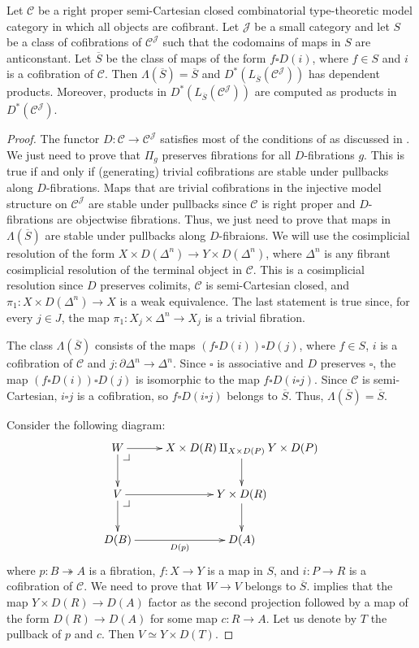 \documentclass[reqno]{amsart}
\makeatletter
\theoremstyle{definition}
\theoremstyle{remark}
\newcommand{\scat}[1]{\mathcal{#1}}
\numberwithin{figure}{section}
\newcommand{\pb}[1][dr]{\save*!/#1-1.2pc/#1:(-1,1)@^{|-}\restore}
\makeatother
\begin{document}
\begin{prop}
Let $\scat{C}$ be a right proper semi-Cartesian closed combinatorial type-theoretic model category in which all objects are cofibrant.
Let $\scat{J}$ be a small category and let $S$ be a class of cofibrations of $\scat{C}^\scat{J}$ such that the codomains of maps in $S$ are anticonstant.
Let $\overline{S}$ be the class of maps of the form $f \square D(i)$, where $f \in S$ and $i$ is a cofibration of $\scat{C}$.
Then $\Lambda(\overline{S}) = \overline{S}$ and $D^*(L_{\overline{S}}(\scat{C}^\scat{J}))$ has dependent products.
Moreover, products in $D^*(L_{\overline{S}}(\scat{C}^\scat{J}))$ are computed as products in $D^*(\scat{C}^\scat{J})$.
\end{prop}
\begin{proof}
The functor $D : \scat{C} \to \scat{C}^\scat{J}$ satisfies most of the conditions of  as discussed in .
We just need to prove that $\Pi_g$ preserves fibrations for all $D$-fibrations $g$.
This is true if and only if (generating) trivial cofibrations are stable under pullbacks along $D$-fibrations.
Maps that are trivial cofibrations in the injective model structure on $\scat{C}^\scat{J}$ are stable under pullbacks since $\scat{C}$ is right proper and $D$-fibrations are objectwise fibrations.
Thus, we just need to prove that maps in $\Lambda(\overline{S})$ are stable under pullbacks along $D$-fibraions.
We will use the cosimplicial resolution of the form $X \times D(\Delta^n) \to Y \times D(\Delta^n)$,
where $\Delta^n$ is any fibrant cosimplicial resolution of the terminal object in $\scat{C}$.
This is a cosimplicial resolution since $D$ preserves colimits, $\scat{C}$ is semi-Cartesian closed, and $\pi_1 : X \times D(\Delta^n) \to X$ is a weak equivalence.
The last statement is true since, for every $j \in J$, the map $\pi_1 : X_j \times \Delta^n \to X_j$ is a trivial fibration.

The class $\Lambda(\overline{S})$ consists of the maps $(f \square D(i)) \square D(j)$, where $f \in S$, $i$ is a cofibration of $\scat{C}$ and $j : \partial \Delta^n \to \Delta^n$.
Since $\square$ is associative and $D$ preserves $\square$, the map $(f \square D(i)) \square D(j)$ is isomorphic to the map $f \square D(i \square j)$.
Since $\scat{C}$ is semi-Cartesian, $i \square j$ is a cofibration, so $f \square D(i \square j)$ belongs to $\overline{S}$.
Thus, $\Lambda(\overline{S}) = \overline{S}$.

Consider the following diagram:
\[ \xymatrix{ W \ar[r] \ar[d] \pb & X \times D(R) \amalg_{X \times D(P)} Y \times D(P) \ar[d] \\
              V \ar[r] \ar[d] \pb & Y \times D(R) \ar[d] \\
              D(B) \ar[r]_{D(p)} & D(A)
            } \]
where $p : B \twoheadrightarrow A$ is a fibration, $f : X \to Y$ is a map in $S$, and $i : P \to R$ is a cofibration of $\scat{C}$.
We need to prove that $W \to V$ belongs to $\overline{S}$.
 implies that the map $Y \times D(R) \to D(A)$ factor as the second projection followed by a map of the form $D(R) \to D(A)$ for some map $c : R \to A$.
Let us denote by $T$ the pullback of $p$ and $c$.
Then $V \simeq Y \times D(T)$.


\end{proof}
\end{document}
